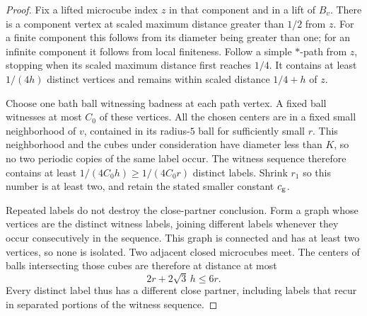 \begin{proof}
Fix a lifted microcube index $z$ in that component and in a lift of $B_v$.
There is a component vertex at scaled maximum distance greater than
$1/2$ from $z$. For a finite component this follows from its diameter
being greater than one; for an infinite component it follows from local
finiteness. Follow a simple $*$-path from $z$, stopping when its scaled
maximum distance first reaches $1/4$. It contains at least $1/(4h)$
distinct vertices and remains within scaled distance $1/4+h$ of $z$.

Choose one bath ball witnessing badness at each path vertex. A fixed ball
witnesses at most $C_0$ of these vertices. All the chosen centers are in
a fixed small neighborhood of $v$, contained in its radius-$5$ ball for
sufficiently small $r$. This neighborhood and the cubes under consideration
have diameter less than $K$, so no two periodic copies of the same label
occur. The witness sequence therefore contains at least
$1/(4C_0h)\ge1/(4C_0r)$ distinct labels. Shrink $r_1$ so this number is
at least two, and retain the stated smaller constant $c_{\rm g}$.

Repeated labels do not destroy the close-partner conclusion. Form a graph
whose vertices are the distinct witness labels, joining different labels
whenever they occur consecutively in the sequence. This graph is connected
and has at least two vertices, so none is isolated. Two adjacent closed
microcubes meet. The centers of balls intersecting those cubes are therefore
at distance at most
\[
 2r+2\sqrt3\,h\le6r.
\]
Every distinct label thus has a different close partner, including labels
that recur in separated portions of the witness sequence.
\end{proof}

